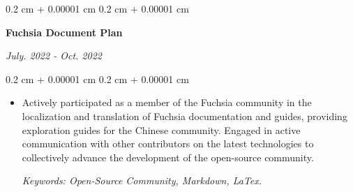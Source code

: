 \documentclass[10pt, letterpaper]{article}
\newenvironment{highlights}{
    \begin{itemize}[
        topsep=0.10 cm,
        parsep=0.10 cm,
        partopsep=0pt,
        itemsep=0pt,
        leftmargin=0.4 cm + 10pt
    ]
}{
    \end{itemize}
} %
\newenvironment{onecolentry}{
    \begin{adjustwidth}{
        0.2 cm + 0.00001 cm
    }{
        0.2 cm + 0.00001 cm
    }
}{
    \end{adjustwidth}
} %
\newenvironment{twocolentry}[2][]{
    \onecolentry
    \def\secondColumn{#2}
    \setcolumnwidth{\fill, 6 cm}
    \begin{paracol}{2}
}{
    \switchcolumn \raggedleft \secondColumn
    \end{paracol}
    \endonecolentry
} %
\let\hrefWithoutArrow\href
\renewcommand{\href}[2]{\hrefWithoutArrow{#1}{\ifthenelse{\equal{#2}{}}{ }{#2 }\raisebox{.15ex}{\footnotesize \faExternalLink*}}}
\begin{document}
        \vspace{0.2 cm}

        \begin{twocolentry}{
            
            
        \textit{July. 2022 - Oct. 2022}}
            \textbf{Fuchsia Document Plan}
        \end{twocolentry}

        \vspace{0.10 cm}
        \begin{onecolentry}
            \begin{highlights}
                \item Actively participated as a member of the Fuchsia community in the localization and translation of Fuchsia documentation and guides, providing exploration guides for the Chinese community. Engaged in active communication with other contributors on the latest technologies to collectively advance the development of the open-source community. \par
                \textit{Keywords: Open-Source Community, Markdown, LaTex.}
            \end{highlights}
        \end{onecolentry}

    \vspace{0.2 cm}




\end{document}
